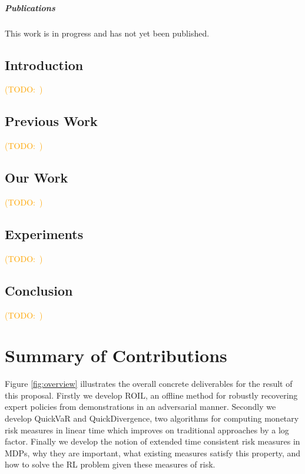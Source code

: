 \documentclass[12pt,letterpaper,oneside]{report}
\theoremstyle{plain}
\theoremstyle{definition}
\theoremstyle{remark}
\newcommand{\todo}[1]{\textcolor{orange}{(TODO:\ #1)}}
\begin{document}
\paragraph{Publications} This work is in progress and has not yet been published.

\section{Introduction}\label{sec:etc-intro}

\todo{}

\section{Previous Work}\label{sec:etc-prior}

\todo{}

\section{Our Work}\label{sec:etc-ours}

\todo{}

\section{Experiments}\label{sec:etc-experiments}

\todo{}

\section{Conclusion}\label{sec:etc-conclusion}

\todo{}

\chapter{Summary of Contributions}\label{ch:contributions}

Figure \ref{fig:overview} illustrates the overall concrete deliverables for the result of this proposal. Firstly we develop ROIL, an offline method for robustly recovering expert policies from demonstrations in an adversarial manner. Secondly we develop QuickVaR and QuickDivergence, two algorithms for computing monetary risk measures in linear time which improves on traditional approaches by a log factor. Finally we develop the notion of extended time consistent risk measures in MDPs, why they are important, what existing measures satisfy this property, and how to solve the RL problem given these measures of risk.
\end{document}
